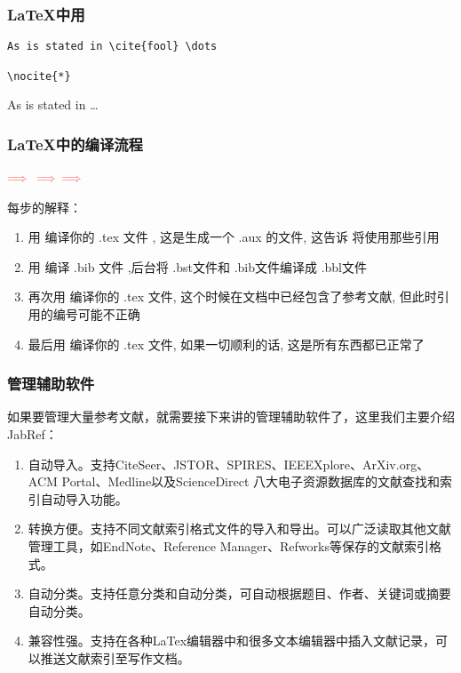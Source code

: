 \begin{frame}[fragile]\frametitle{\LaTeX{}中用\BibTeX{}}
\begin{block}{}
    \begin{verbatim}
As is stated in \cite{fool} \dots

\nocite{*}
    \end{verbatim}
\end{block}
\begin{block}{}
    As is stated in \cite{fool} \dots
    
    \nocite{*}
\end{block}
\end{frame}

\begin{frame}[fragile]\frametitle{\LaTeX{}中\BibTeX{}的编译流程}
\begin{block}{}
    \center
    \XeLaTeX{} $\color{red!70}\Longrightarrow{}$ \BibTeX{} $\color{red!70}\Longrightarrow$ \XeLaTeX{} $\color{red!70}\Longrightarrow$ \XeLaTeX{}
\end{block}
每步的解释：
\begin{enumerate}
    \item<2-> 用\XeLaTeX{} 编译你的 .tex 文件 , 这是生成一个 .aux 的文件, 这告诉\BibTeX{} 将使用那些引用
    \item<3-> 用\BibTeX{} 编译 .bib 文件 ,后台将 .bst文件和 .bib文件编译成 .bbl文件
    \item<4-> 再次用\XeLaTeX{} 编译你的 .tex 文件, 这个时候在文档中已经包含了参考文献, 但此时引用的编号可能不正确
    \item<5-> 最后用\XeLaTeX{} 编译你的 .tex 文件, 如果一切顺利的话, 这是所有东西都已正常了
\end{enumerate}
\end{frame}

\begin{frame}\frametitle{\BibTeX{}管理辅助软件}
如果要管理大量参考文献，就需要接下来讲的\BibTeX{}管理辅助软件了，这里我们主要介绍JabRef：
\begin{enumerate}
    \item<2-> 自动导入。支持CiteSeer、JSTOR、SPIRES、IEEEXplore、ArXiv.org、ACM Portal、Medline以及ScienceDirect 八大电子资源数据库的文献查找和索引自动导入功能。
    \item<3-> 转换方便。支持不同文献索引格式文件的导入和导出。可以广泛读取其他文献管理工具，如EndNote、Reference Manager、Refworks等保存的文献索引格式。
    \item<4-> 自动分类。支持任意分类和自动分类，可自动根据题目、作者、关键词或摘要自动分类。
    \item<5-> 兼容性强。支持在各种LaTex编辑器中和很多文本编辑器中插入文献记录，可以推送文献索引至写作文档。
\end{enumerate}
\end{frame} 